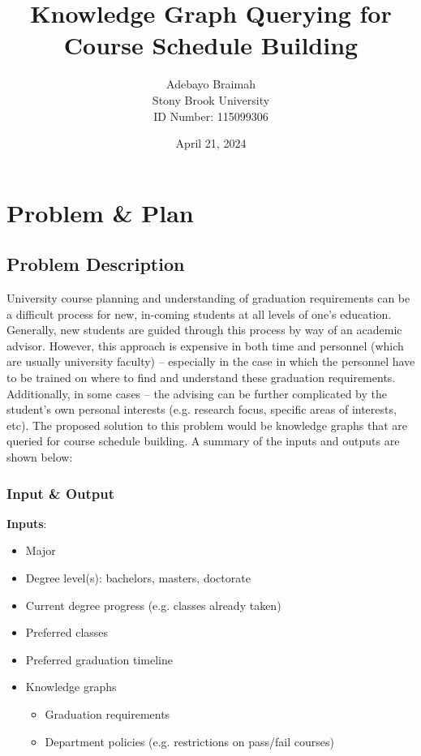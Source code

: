 \documentclass[12pt]{article}
\title{\Large \bf 
Knowledge Graph Querying for Course Schedule Building
}
\author{
{\rm Adebayo Braimah}\\
Stony Brook University \\
{\rm ID Number: 115099306}
}
\date{April 21, 2024}
\begin{document}
    
    \maketitle
        
    \section{Problem \& Plan}
    \label{sec:prob_plan}
    
    \subsection{Problem Description}
    \label{subsec:problem}
    University course planning and understanding of graduation requirements can be a difficult process for new, in-coming students at all levels of one's education. Generally, new students are guided through this process by way of an academic advisor. However, this approach is expensive in both time and personnel (which are usually university faculty) -- especially in the case in which the personnel have to be trained on where to find and understand these graduation requirements. Additionally, in some cases -- the advising can be further complicated by the student's own personal interests (e.g. research focus, specific areas of interests, etc). The proposed solution to this problem would be knowledge graphs that are queried for course schedule building. A summary of the inputs and outputs are shown below:

    \subsubsection{Input \& Output}
    \label{subsubsec:in-out}
    
    \textbf{Inputs}:

    \begin{itemize}
        \label{items:inputs}
        \item Major
        \item Degree level(s): bachelors, masters, doctorate
        \item Current degree progress (e.g. classes already taken)
        \item Preferred classes
        \item Preferred graduation timeline
        \item Knowledge graphs
        \begin{itemize}
            \item Graduation requirements
            \item Department policies (e.g. restrictions on pass/fail courses)
        \end{itemize}
    \end{itemize}
\end{document}
